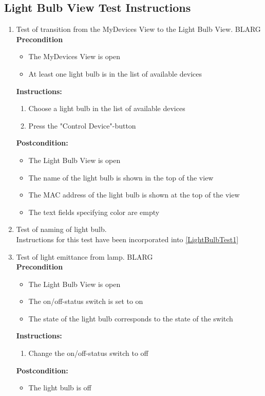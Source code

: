 \documentclass[a4paper]{article}
\newlength{\testlabellength}
\newenvironment{testlist}{\begin{enumerate}[label=\bfseries Instruction \thesubsection.\arabic* , labelindent=0pt, labelwidth=\testlabellength , leftmargin=2cm]}{\end{enumerate}}
\newenvironment{precondition}{
{\color{white}BLARG}\\ 
\textbf{Precondition}
\begin{itemize}[labelindent=0cm, labelwidth=2cm , leftmargin=1cm]
}
{\end{itemize}}
\newenvironment{instruction}{
\textbf{Instructions:}
\begin{enumerate}[label=\bfseries  \arabic*., labelindent=0cm, labelwidth=2cm , leftmargin=1cm]
}
{\end{enumerate}}
\newenvironment{postcondition}{
\textbf{Postcondition:}
\begin{itemize}[labelindent=0cm, labelwidth=2cm , leftmargin=1cm]
}
{\end{itemize}}
\begin{document}
\begin{appendices}
\subsection{Light Bulb View Test Instructions}
\begin{testlist}

    \item Test of transition from the MyDevices View to the Light Bulb View. \label{LightBulbTest1}
    	\begin{precondition}
    		\item The MyDevices View is open
    		\item At least one light bulb is in the list of available devices
    	\end{precondition}
    	\begin{instruction}
    			\item Choose a light bulb in the list of available devices
    			\item Press the "Control Device"-button
    	\end{instruction}
    	\begin{postcondition}
    		\item The Light Bulb View is open
    		\item The name of the light bulb is shown in the top of the view
    		\item The MAC address of the light bulb is shown at the top of the view
    		\item The text fields specifying color are empty
    	\end{postcondition}

	
	\item Test of naming of light bulb.\\
		Instructions for this test have been incorporated into \ref{LightBulbTest1}
    	
	
	\item Test of light emittance from lamp.
		\begin{precondition}
			\item The Light Bulb View is open
			\item The on/off-status switch is set to on
			\item The state of the light bulb corresponds to the state of the switch
		\end{precondition}
    	\begin{instruction}
    		\item Change the on/off-status switch to off
    	\end{instruction}
    	\begin{postcondition}
    		\item The light bulb is off
    	\end{postcondition}  		
  

\end{testlist}
\end{appendices}
\end{document}
